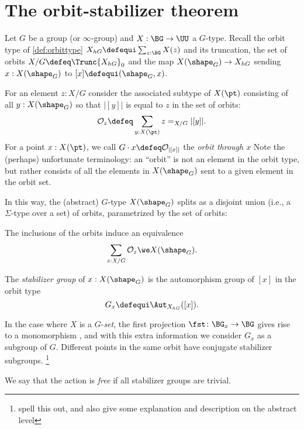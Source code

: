 \section{The orbit-stabilizer theorem}
\label{sec:orbit-stabilizer-theorem}


Let $G$ be a group (or $\infty$-group) and  $X : \BG \to \UU$  a $G$-type.
Recall the orbit type of \cref{def:orbittype} $X_{hG}\defequi
\sum_{z:\BG}X(z)$ and its truncation, the set of orbits $X / G \defeq \Trunc{X_{hG}}_0$ and the map $X(\shape_G)\to X_{hG}$ sending $x:X(\shape_G)$ to $[x]\defequi (\shape_G,x)$.

For an element $z:X/G$ consider the associated subtype of $X(\pt)$ consisting of
 all $y : X(\shape_G)$ so that $|[y]|$ is equal to $z$ in the set of orbits:
\[
  \mathcal O_{z} \defeq \sum_{y : X(\pt)} z =_{X/G} |[y]|.
\]
 For a point $x : X(\pt)$, we call $G\cdot x \defeq \mathcal O_{|[x]|}$ 
 the \emph{orbit through $x$}%
Note the (perhaps) unfortunate terminology: an ``orbit'' is not an element in the
orbit type, but rather consists of all the elements in $X(\shape_G)$ sent to a given element in the orbit set.

In this way, the (abstract) $G$-type $X(\shape_G)$ splits as a disjoint union (i.e., a $\Sigma$-type over a set) of orbits,
parametrized by the set of orbits:
\begin{lemma}
  \label{lem:splitting into orbits}
  The inclusions of the orbits induce an equivalence 
\[
  \sum_{z : X / G} \mathcal O_z  \we X(\shape_G).
\]
\end{lemma}

The \emph{stabilizer group} of $x : X(\shape_G)$ is the automorphism group of $[x]$ in the orbit type
$$G_x\defequi\Aut_{X_{hG}}([x]).$$


In the case where $X$ is a $G$-\emph{set}, the first projection $\fst\colon \BG_x\to\BG$ gives rise to a monomorphism , and with this extra information we consider $G_x$ as a subgroup of $G$.
Different points in the same orbit have conjugate stabilizer subgroups.
\footnote{spell this out, and also give some explanation and description on the abstract level}

We say that the action is \emph{free} if all stabilizer groups are trivial.

